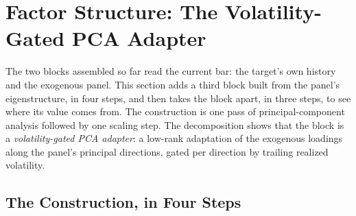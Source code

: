 \section{Factor Structure: The Volatility-Gated PCA Adapter}
\label{sec:pca_factors}


The two blocks assembled so far read the current bar: the target's own
history and the exogenous panel. This section adds a third block built from
the panel's eigenstructure, in four steps, and then takes the block apart,
in three steps, to see where its value comes from. The construction is one
pass of principal-component analysis followed by one scaling step. The
decomposition shows that the block is a \emph{volatility-gated PCA
adapter}: a low-rank adaptation of the exogenous loadings along the
panel's principal directions, gated per direction by trailing realized
volatility.

\subsection{The Construction, in Four Steps}
\label{sec:pca_frame}

